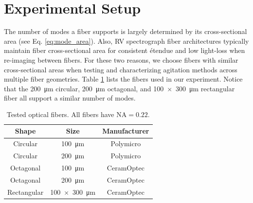 \documentclass[twocolumn]{emulateapj}
\begin{document}
\section{Experimental Setup}
\label{sec:experimental_setup}

The number of modes a fiber supports is largely determined by its cross-sectional area (see Eq. \ref{eq:mode_area}). Also, RV spectrograph fiber architectures typically maintain fiber cross-sectional area for consistent \'etendue and low light-loss when re-imaging between fibers. For these two reasons, we choose fibers with similar cross-sectional areas when testing and characterizing agitation methods across multiple fiber geometries. Table \ref{table:fibers} lists the fibers used in our experiment. Notice that the \SI{200}{\micro\meter} circular, \SI{200}{\micro\meter} octagonal, and \SI{100x300}{\micro\meter} rectangular fiber all support a similar number of modes.

\begin{table}
\centering
\caption{Tested optical fibers. All fibers have $\mathrm{NA} = 0.22$.}
	\begin{tabular}{ccc}
	\hline
	Shape & Size & Manufacturer \\
	\hline
	\hline
	Circular & \SI{100}{\micro\meter} & Polymicro \\
	Circular & \SI{200}{\micro\meter} & Polymicro \\
	Octagonal & \SI{100}{\micro\meter} & CeramOptec \\
	Octagonal & \SI{200}{\micro\meter} & CeramOptec \\
	Rectangular & \SI{100x300}{\micro\meter} & CeramOptec \\
	\hline
	\end{tabular}
\label{table:fibers}
\end{table}
\end{document}
